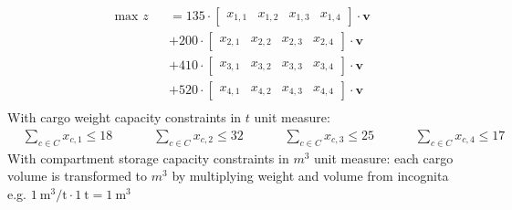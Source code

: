\documentclass[unicode,11pt,a4paper,oneside,numbers=endperiod,openany]{scrartcl}
\begin{document}
\begin{equation*}
	\begin{aligned}
		 & \text{max } z &  & = 135 \cdot \begin{bmatrix} x_{1,1} & x_{1,2} & x_{1,3} & x_{1,4} \end{bmatrix} \cdot \mathbf{v} \\
		 &               &  & + 200 \cdot \begin{bmatrix} x_{2,1} & x_{2,2} & x_{2,3} & x_{2,4} \end{bmatrix} \cdot \mathbf{v} \\
		 &               &  & + 410 \cdot \begin{bmatrix} x_{3,1} & x_{3,2} & x_{3,3} & x_{3,4} \end{bmatrix} \cdot \mathbf{v} \\
		 &               &  & + 520 \cdot \begin{bmatrix} x_{4,1} & x_{4,2} & x_{4,3} & x_{4,4} \end{bmatrix} \cdot \mathbf{v} \\
	\end{aligned}
\end{equation*}
With cargo weight capacity constraints in $t$ unit measure:
\begin{equation*}
	\begin{aligned}
		 &
		\sum_{c \in C}^{} x_{c,1}  \leq 18
		 &   &  &  &
		\sum_{c \in C}^{} x_{c,2}  \leq 32
		 &   &  &  &
		\sum_{c \in C}^{} x_{c,3}  \leq 25
		 &   &  &  &
		\sum_{c \in C}^{} x_{c,4}  \leq 17
	\end{aligned}
\end{equation*}
With compartment storage capacity constraints in $m^3$ unit measure:
each cargo volume is transformed to $m^3$ by multiplying weight and volume from incognita
e.g. $\SI{1}{\meter^3\per\tonne} \cdot \SI{1}{\tonne} = \SI{1}{\meter^3}$
\end{document}
